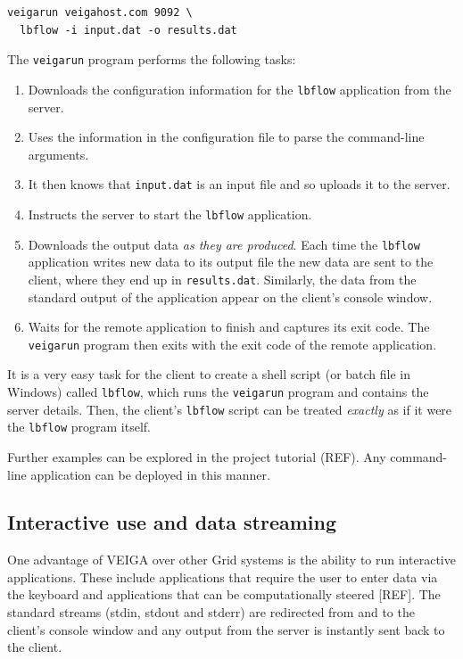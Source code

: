 \documentclass[a4paper]{article}
\begin{document}
\begin{multicols}{2}
\begin{verbatim}
veigarun veigahost.com 9092 \
  lbflow -i input.dat -o results.dat
\end{verbatim}

The {\tt veigarun} program performs the following tasks:

\begin{enumerate}
\item Downloads the configuration information for the {\tt lbflow} application from the server.
\item Uses the information in the configuration file to parse the command-line arguments.
\item It then knows that {\tt input.dat} is an input file and so uploads it to the server.
\item Instructs the server to start the {\tt lbflow} application.
\item Downloads the output data {\em as they are produced\/}. Each time the {\tt lbflow} application writes new data to its output file the new data are sent to the client, where they end up in {\tt results.dat}.  Similarly, the data from the standard output of the application appear on the client's console window.
\item Waits for the remote application to finish and captures its exit code.  The {\tt veigarun} program then exits with the exit code of the remote application.
\end{enumerate}

It is a very easy task for the client to create a shell script (or batch file in Windows) called {\tt lbflow}, which runs the {\tt veigarun} program and contains the server details.  Then, the client's {\tt lbflow} script can be treated {\em exactly\/} as if it were the {\tt lbflow} program itself.

Further examples can be explored in the project tutorial (REF).  Any command-line application can be deployed in this manner.

\subsection{Interactive use and data streaming}\label{sec:interactive}
One advantage of VEIGA over other Grid systems is the ability to run interactive applications.  These include applications that require the user to enter data via the keyboard and applications that can be computationally steered [REF].  The standard streams (stdin, stdout and stderr) are redirected from and to the client's console window and any output from the server is instantly sent back to the client.


\end{multicols}
\end{document}

